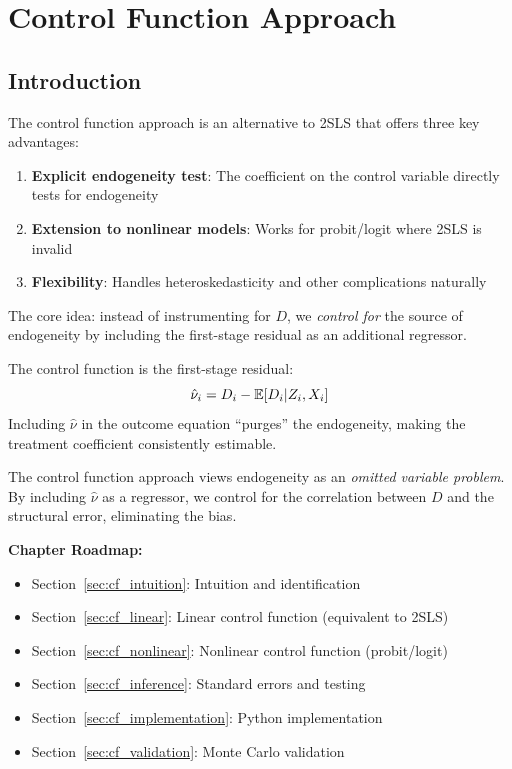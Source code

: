 
\chapter{Control Function Approach}
\label{ch:control_function}

\section{Introduction}
\label{sec:cf_intro}

The control function approach is an alternative to 2SLS that offers three key advantages:

\begin{enumerate}
    \item \textbf{Explicit endogeneity test}: The coefficient on the control variable directly tests for endogeneity
    \item \textbf{Extension to nonlinear models}: Works for probit/logit where 2SLS is invalid
    \item \textbf{Flexibility}: Handles heteroskedasticity and other complications naturally
\end{enumerate}

The core idea: instead of instrumenting for $D$, we \emph{control for} the source of endogeneity by including the first-stage residual as an additional regressor.

\begin{definition}
\label{def:control_function}
The control function is the first-stage residual:
\[
\hat{\nu}_i = D_i - \mathbb{E}[D_i | Z_i, X_i]
\]
Including $\hat{\nu}$ in the outcome equation ``purges'' the endogeneity, making the treatment coefficient consistently estimable.
\end{definition}

\begin{insight}
The control function approach views endogeneity as an \emph{omitted variable problem}. By including $\hat{\nu}$ as a regressor, we control for the correlation between $D$ and the structural error, eliminating the bias.
\end{insight}

\textbf{Chapter Roadmap:}
\begin{itemize}
    \item Section~\ref{sec:cf_intuition}: Intuition and identification
    \item Section~\ref{sec:cf_linear}: Linear control function (equivalent to 2SLS)
    \item Section~\ref{sec:cf_nonlinear}: Nonlinear control function (probit/logit)
    \item Section~\ref{sec:cf_inference}: Standard errors and testing
    \item Section~\ref{sec:cf_implementation}: Python implementation
    \item Section~\ref{sec:cf_validation}: Monte Carlo validation
\end{itemize}


